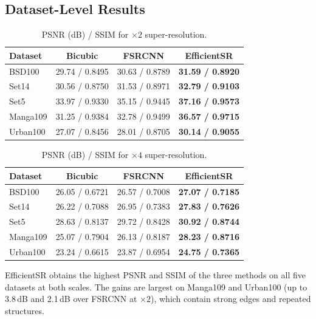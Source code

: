 \documentclass[11pt]{article}
\begin{document}
\subsection{Dataset-Level Results}
\begin{table}[htbp]
\centering
\caption{PSNR (dB) / SSIM for $\times2$ super-resolution.}
\label{tab:x2_datasets}
\small
\begin{tabular}{@{}lccc@{}}
\toprule
\textbf{Dataset} & \textbf{Bicubic} & \textbf{FSRCNN} & \textbf{EfficientSR} \\
\midrule
BSD100   & 29.74 / 0.8495 & 30.63 / 0.8789 & \textbf{31.59 / 0.8920} \\
Set14    & 30.56 / 0.8750 & 31.53 / 0.8971 & \textbf{32.79 / 0.9103} \\
Set5     & 33.97 / 0.9330 & 35.15 / 0.9445 & \textbf{37.16 / 0.9573} \\
Manga109 & 31.25 / 0.9384 & 32.78 / 0.9499 & \textbf{36.57 / 0.9715} \\
Urban100 & 27.07 / 0.8456 & 28.01 / 0.8705 & \textbf{30.14 / 0.9055} \\
\bottomrule
\end{tabular}
\end{table}

\begin{table}[htbp]
\centering
\caption{PSNR (dB) / SSIM for $\times4$ super-resolution.}
\label{tab:x4_datasets}
\small
\begin{tabular}{@{}lccc@{}}
\toprule
\textbf{Dataset} & \textbf{Bicubic} & \textbf{FSRCNN} & \textbf{EfficientSR} \\
\midrule
BSD100   & 26.05 / 0.6721 & 26.57 / 0.7008 & \textbf{27.07 / 0.7185} \\
Set14    & 26.22 / 0.7088 & 26.95 / 0.7383 & \textbf{27.83 / 0.7626} \\
Set5     & 28.63 / 0.8137 & 29.72 / 0.8428 & \textbf{30.92 / 0.8744} \\
Manga109 & 25.07 / 0.7904 & 26.13 / 0.8187 & \textbf{28.23 / 0.8716} \\
Urban100 & 23.24 / 0.6615 & 23.87 / 0.6954 & \textbf{24.75 / 0.7365} \\
\bottomrule
\end{tabular}
\end{table}

EfficientSR obtains the highest PSNR and SSIM of the three methods on all five datasets at both scales. The gains are largest on Manga109 and Urban100 (up to 3.8\,dB and 2.1\,dB over FSRCNN at $\times2$), which contain strong edges and repeated structures.
\end{document}
